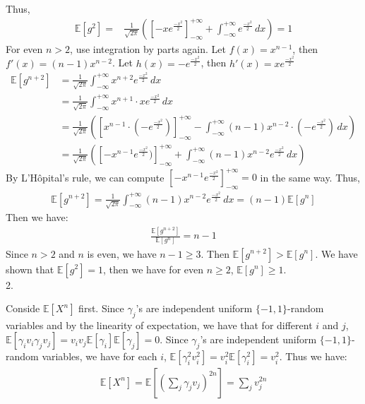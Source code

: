 Thus,
\begin{align}
    \nonumber \mathbb{E}[g^2]=&\frac{1}{\sqrt{2\pi}}(\left[-xe^{\frac{-x^2}{2}}\right]_{-\infty}^{+\infty}+\int_{-\infty }^{+\infty }e^{\frac{-x^2}{2}}\,dx )=1
\end{align}
For even $n > 2$, use integration by parts again.
Let $f(x)=x^{n-1}$, then $f'(x)=(n-1)x^{n-2}$. Let $h(x)=-e^{\frac{-x^2}{2}} $, then $h'(x)= xe^{\frac{-x^2}{2}}$
\begin{align}
    \nonumber \mathbb{E}[g^{n+2}]&=\frac{1}{\sqrt{2\pi}}\int_{-\infty }^{+\infty }x^{n+2}e^{\frac{-x^2}{2}}\,dx\\
    \nonumber &=\frac{1}{\sqrt{2\pi}}\int_{-\infty }^{+\infty }x^{n+1}\cdot x e^{\frac{-x^2}{2}}\,dx\\
    \nonumber &=\frac{1}{\sqrt{2\pi}}\left(\left[x^{n-1}\cdot (-e^{\frac{-x^2}{2}})\right]_{-\infty}^{+\infty}-\int_{-\infty }^{+\infty }(n-1)x^{n-2}\cdot (-e^{\frac{-x^2}{2}})\,dx \right)\\
    \nonumber &=\frac{1}{\sqrt{2\pi}}\left(\left[-x^{n-1}e^{\frac{-x^2}{2}})\right]_{-\infty}^{+\infty}+\int_{-\infty }^{+\infty }(n-1)x^{n-2}e^{\frac{-x^2}{2}}\,dx \right)
\end{align}
By L'Hôpital's rule, we can compute $\left[-x^{n-1}e^{\frac{-x^2}{2}}\right]_{-\infty}^{+\infty}=0$ in the same way.
Thus,
\begin{align}
    \nonumber \mathbb{E}[g^{n+2}]=\frac{1}{\sqrt{2\pi}}\int_{-\infty }^{+\infty }(n-1)x^{n-2}e^{\frac{-x^2}{2}}\,dx 
    =(n-1)\mathbb{E}[g^{n}]
\end{align} 
Then we have:
\begin{align}
    \nonumber \frac{\mathbb{E}[g^{n+2}]}{\mathbb{E}[g^{n}]}=n-1
\end{align}
Since $n>2$ and $n$ is even, we have $n-1\ge 3$.
Then $\mathbb{E}[g^{n+2}]>\mathbb{E}[g^{n}]$.
We have shown that $\mathbb{E}[g^{2}]=1$, then we have for even $n \ge 2$, $\mathbb{E}[g^n]\ge 1$.\\
2.

Conside $\mathbb{E}[X^n]$ first.
Since $\gamma _j$'s are independent uniform $\{-1,1\}$-random variables and by the linearity of expectation,
we have that for different $i$ and $j$, $\mathbb{E}[\gamma _iv_i\gamma _jv_j]=v_iv_j\mathbb{E}[\gamma _i]\mathbb{E}[\gamma _j]=0$.
Since $\gamma _j$'s are independent uniform $\{-1,1\}$-random variables, we have for each $i$, $\mathbb{E}[\gamma _i^2v_i^2]=v_i^2\mathbb{E}[\gamma _i^2]=v_i^2$.
Thus we have:
\begin{align}
    \nonumber \mathbb{E}[X^n]=\mathbb{E}[(\sum_j\gamma _jv_j)^{2n}] 
    =\sum_j v_j^{2n}
\end{align}


